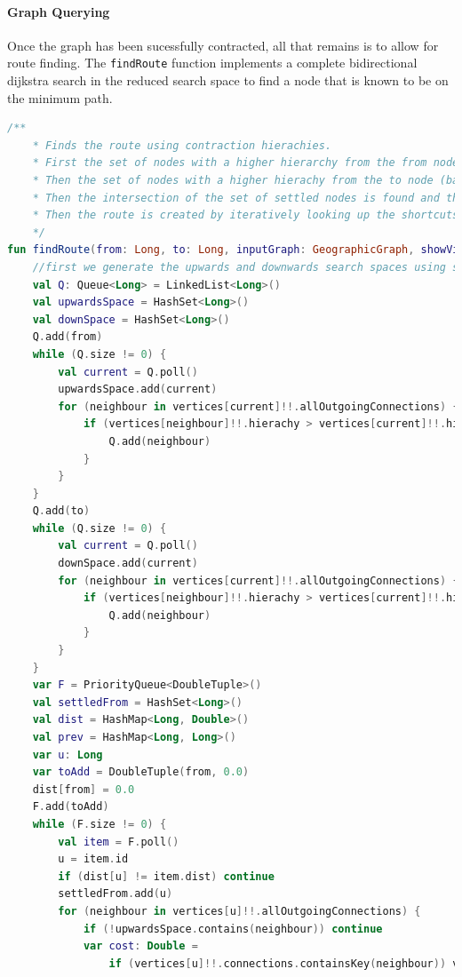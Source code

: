 \documentclass[11pt,twoside,a4paper]{article}
\begin{document}
\paragraph{Graph Querying}
Once the graph has been sucessfully contracted, all that remains is to allow for route finding. 
The \texttt{findRoute} function implements a complete bidirectional dijkstra search in the reduced search space to find a node that is known to be on the minimum path.
\begin{lstlisting}[language=kotlin]
/**
    * Finds the route using contraction hierachies.
    * First the set of nodes with a higher hierarchy from the from node are calculated
    * Then the set of nodes with a higher hierachy from the to node (backwards) are calculated
    * Then the intersection of the set of settled nodes is found and the minimum found
    * Then the route is created by iteratively looking up the shortcuts
    */
fun findRoute(from: Long, to: Long, inputGraph: GeographicGraph, showVisited: Boolean): List<Long> {
    //first we generate the upwards and downwards search spaces using simple queues
    val Q: Queue<Long> = LinkedList<Long>()
    val upwardsSpace = HashSet<Long>()
    val downSpace = HashSet<Long>()
    Q.add(from)
    while (Q.size != 0) {
        val current = Q.poll()
        upwardsSpace.add(current)
        for (neighbour in vertices[current]!!.allOutgoingConnections) {
            if (vertices[neighbour]!!.hierachy > vertices[current]!!.hierachy && !upwardsSpace.contains(neighbour)) {
                Q.add(neighbour)
            }
        }
    }
    Q.add(to)
    while (Q.size != 0) {
        val current = Q.poll()
        downSpace.add(current)
        for (neighbour in vertices[current]!!.allOutgoingConnections) {
            if (vertices[neighbour]!!.hierachy > vertices[current]!!.hierachy && !downSpace.contains(neighbour)) {
                Q.add(neighbour)
            }
        }
    }
    var F = PriorityQueue<DoubleTuple>()
    val settledFrom = HashSet<Long>()
    val dist = HashMap<Long, Double>()
    val prev = HashMap<Long, Long>()
    var u: Long
    var toAdd = DoubleTuple(from, 0.0)
    dist[from] = 0.0
    F.add(toAdd)
    while (F.size != 0) {
        val item = F.poll()
        u = item.id
        if (dist[u] != item.dist) continue
        settledFrom.add(u)
        for (neighbour in vertices[u]!!.allOutgoingConnections) {
            if (!upwardsSpace.contains(neighbour)) continue
            var cost: Double =
                if (vertices[u]!!.connections.containsKey(neighbour)) vertices[u]!!.connections[neighbour]!!

\end{lstlisting}
\end{document}
